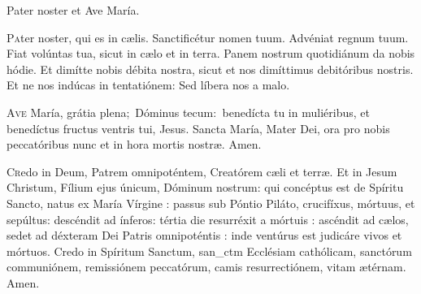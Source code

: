 \documentclass[vesperale_romanum.tex]{subfiles}
\begin{document}
Pater noster et Ave María.

\myrule


\lettrine{P}{a}ter noster, qui es in cælis. Sanctificétur nomen tuum. Advéniat regnum tuum. Fiat volúntas tua, sicut in cælo et in terra. Panem nostrum quotidiánum da nobis hódie. Et dimítte nobis débita nostra, sicut et nos dimíttimus debitóribus nostris. Et ne nos indúcas in tentatiónem: Sed líbera nos a malo. 

\lettrine{A}{ve} María, grátia plena; Dóminus tecum:  benedícta tu in muliéribus, et benedíctus fru\-ctus ventris tui, Jesus. Sancta María, Mater Dei, ora pro nobis peccatóribus nunc et in hora mortis nostræ. Amen.

\lettrine{C}{r}edo in Deum, Patrem omnipoténtem, Creatórem cæli et terræ. Et in Jesum Christum, Fílium ejus únicum, Dóminum nostrum: qui concé\-ptus est de Spíritu San\-cto, natus ex María Vírgine : passus sub Póntio Piláto, crucifíxus, mórtuus, et sepúltus: descéndit ad ínferos: tértia die resurréxit a mórtuis : ascéndit ad cælos, sedet ad déxteram Dei Patris omnipot\-éntis : inde ventúrus est judicáre vivos et mórtuos. Credo in Spíritum San\-ctum, san\_ctm Ecclésiam cathólicam, san\-ctórum communiónem, remissiónem peccatórum, camis resurrectiónem, vitam ætérnam. Amen.
\end{document}
